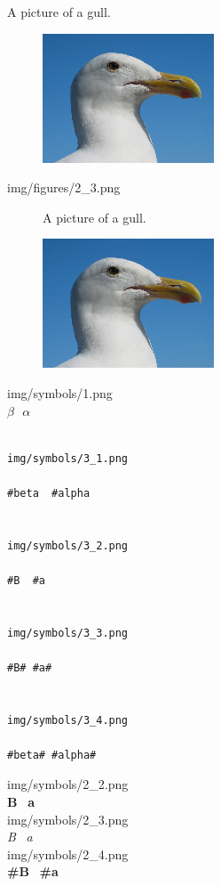 \documentclass[14pt]{article}
\begin{document}
A picture of a gull.
\begin{figure}[H]
\includegraphics[scale=1]{gull.png}
\end{figure}
\newpage
\noindent
img/figures/2\_3.png\\[.5cm]
\begin{figure}[H]
\begin{center}
\fontsize{14}{14}\selectfont
A picture of a gull.\\
\setlength{\itemsep}{12pt}
\setlength{\parskip}{12pt}
\setlength{\parsep}{12pt}

\includegraphics[scale=1]{gull.png}
\end{center}
\end{figure}
\noindent
img/symbols/1.png\\[.5cm]
$\beta\ \ \  \alpha$
\begin{verbatim}

img/symbols/3_1.png

#beta  #alpha


img/symbols/3_2.png

#B  #a


img/symbols/3_3.png

#B# #a#


img/symbols/3_4.png

#beta# #alpha#

\end{verbatim}
\noindent
img/symbols/2\_2.png\\[.5cm]
\textbf{B} \ \textbf{a}\\[.5cm]
img/symbols/2\_3.png\\[.5cm]
\textit{B} \ \textit{a}\\[.5cm]
img/symbols/2\_4.png\\[.5cm]
\textbf{\#B} \ \textbf{\#a}\\[.5cm]
\end{document}
